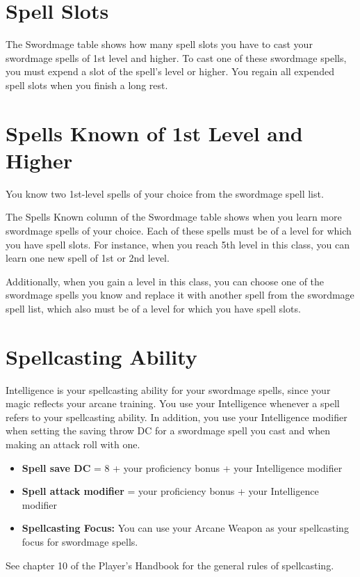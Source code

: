 \begin{multicols*}{2}
\section*{Spell Slots}
The Swordmage table shows how many spell slots you have
to cast your swordmage spells of 1st level and higher. To cast
one of these swordmage spells, you must expend a slot of the
spell's level or higher. You regain all expended spell slots
when you finish a long rest.

\section*{Spells Known of 1st Level and Higher}
You know two 1st-level spells of your choice from the
swordmage spell list.

The Spells Known column of the Swordmage table shows
when you learn more swordmage spells of your choice. Each
of these spells must be of a level for which you have spell
slots. For instance, when you reach 5th level in this class, you
can learn one new spell of 1st or 2nd level.

Additionally, when you gain a level in this class, you can
choose one of the swordmage spells you know and replace it
with another spell from the swordmage spell list, which also
must be of a level for which you have spell slots.

\section*{Spellcasting Ability}
Intelligence is your spellcasting ability for your swordmage
spells, since your magic reflects your arcane training. You
use your Intelligence whenever a spell refers to your
spellcasting ability. In addition, you use your Intelligence
modifier when setting the saving throw DC for a swordmage
spell you cast and when making an attack roll with one.

\begin{itemize}
    \item \textbf{Spell save DC} = 8 + your proficiency bonus + your
    Intelligence modifier
    \item \textbf{Spell attack modifier} = your proficiency bonus + your
    Intelligence modifier
    \item \textbf{Spellcasting Focus:} You can use your Arcane Weapon as
    your spellcasting focus for swordmage spells.
\end{itemize}


See chapter 10 of the Player’s Handbook for the general
rules of spellcasting.


\end{multicols*}
